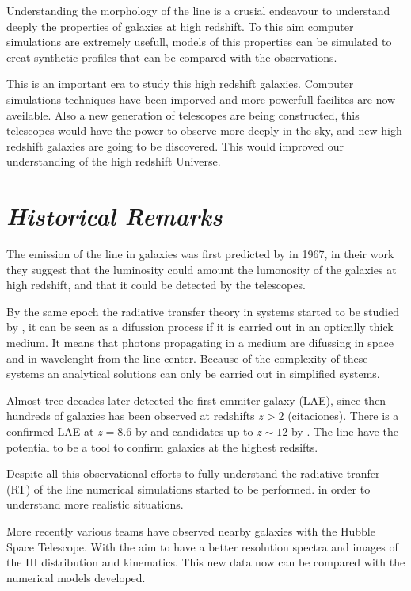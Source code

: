 Understanding the morphology of the \ly line is a crusial endeavour 
to understand deeply the properties of galaxies at high redshift. To this aim 
computer simulations are extremely usefull, models of this properties 
can be simulated to creat synthetic profiles that can be compared
with the observations. 

This is an important era to study this high redshift galaxies. Computer 
simulations techniques have been imporved and more powerfull facilites are
now aveilable. Also a new generation of telescopes are being constructed,
this telescopes would have the power to observe more deeply in the sky, 
and new high redshift galaxies are going to be discovered. This would 
improved our understanding of the high redshift Universe. 

\section{\emph{Historical Remarks}}

The emission of the \ly line in galaxies was first predicted by 
\citep{PartridgePeebles} in 1967, in their work they suggest that the \ly luminosity
could amount the lumonosity of the galaxies at high redshift, and that 
it could be detected by the telescopes. 

By the same epoch the radiative transfer theory in \ly systems started to be
 studied by \citep{Osterbrock62, Adams72,Harrington73, Neufeld90},
 it can be seen as a difussion process if it is carried out in 
 an optically thick medium. It means that \ly photons propagating 
in a medium are difussing in space and in wavelenght from the line center.   
Because of the complexity of these systems an analytical solutions 
can only be carried out in simplified systems. 


Almost tree decades later \citep{DjorgovskiThomson92} detected the first \ly 
emmiter galaxy (LAE), since then hundreds of galaxies has been  
observed at redshifts $z>2$ (citaciones). There is a confirmed LAE at $z=8.6$ 
by \citep{Lenhert2010} and candidates up to $z\sim12$ by \citep{Brammer13}. 
The \ly line have the potential to be a tool to confirm galaxies at the highest 
redsifts. 

Despite all this observational efforts to fully understand the radiative
tranfer (RT) of the \ly line numerical simulations started to be performed.
\citep{DijkstraKramer, Laursen09, Verhamme06, CLARA}
in order to understand more realistic situations.

More recently various teams \citep{Mas-Hesse09,LARS} have
observed nearby galaxies with the Hubble Space Telescope. With the
aim to have a better resolution spectra and images of the HI distribution 
and kinematics. This new data now can be compared with the numerical 
models developed.


